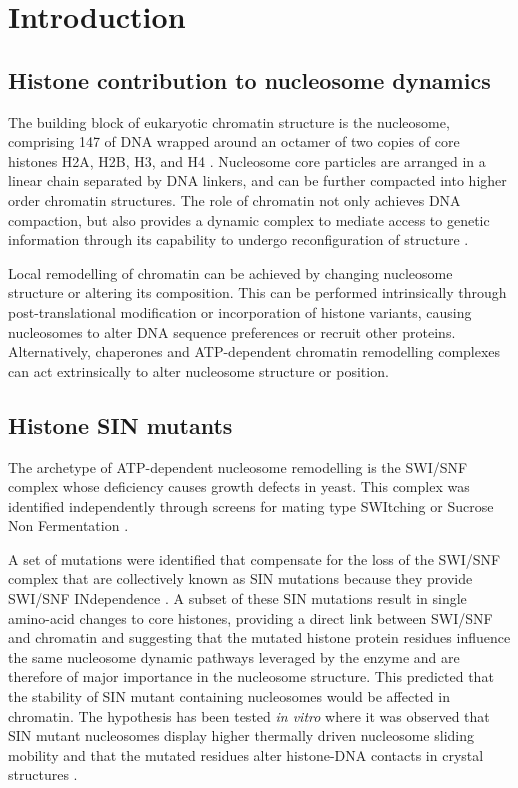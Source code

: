 \section{Introduction}

  \subsection{Histone contribution to nucleosome dynamics}

    The building block of eukaryotic chromatin structure is the nucleosome, comprising
    \SI{147}{\bp} of DNA wrapped around an octamer of two copies of core histones H2A,
    H2B, H3, and H4 \citep{luger1997crystal}.
    Nucleosome core particles are arranged in a linear chain separated by DNA linkers, and
    can be further compacted into higher order chromatin structures.
    The role of chromatin not only achieves DNA compaction,
    but also provides a dynamic complex to mediate access to genetic
    information through its capability to undergo reconfiguration of
    structure \citep{flaus2017unlocking}.

    Local remodelling of chromatin can be achieved
    by changing nucleosome structure or altering its composition.
    This can be performed intrinsically through post-translational modification
    or incorporation of histone variants,
    causing nucleosomes to alter DNA sequence preferences or recruit other proteins.
    Alternatively, chaperones and ATP-dependent chromatin remodelling complexes
    can act extrinsically to alter nucleosome structure or position.

  \subsection{Histone SIN mutants}

    The archetype of ATP-dependent nucleosome remodelling is the SWI/SNF complex
    whose deficiency causes growth defects in yeast.
    This complex was identified independently through screens for
    mating type SWItching \citep{SWI-mutants}
    or Sucrose Non Fermentation \citep{SNF-mutants-original-discovery, SNF-mutants2}.

    A set of mutations were identified that compensate
    for the loss of the SWI/SNF complex
    that are collectively known as SIN mutations because they
    provide SWI/SNF INdependence \citep{kruger1995amino}.
    A subset of these SIN mutations result in single amino-acid changes to core histones,
    providing a direct link between SWI/SNF and chromatin and suggesting
    that the mutated histone protein residues influence the same 
    nucleosome dynamic pathways leveraged by the enzyme and are therefore
    of major importance in the nucleosome structure.
    This predicted that the stability of SIN mutant containing nucleosomes would be affected in chromatin.
    The hypothesis has been tested \textit{in vitro}
    where it was observed that SIN mutant nucleosomes display higher 
    thermally driven nucleosome sliding mobility \citep{flaus2004sin}
    and that the mutated residues alter histone-DNA contacts in
    crystal structures \citep{muthurajan2004crystal}.

